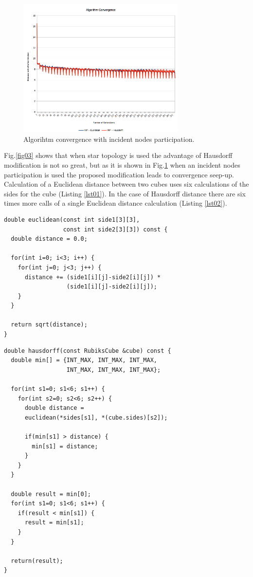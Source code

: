 \documentclass[runningheads]{llncs}
\begin{document}
\begin{figure}
\includegraphics[width=0.75\textwidth]{fig04.png}
\centering
\caption{Algorihtm convergence with incident nodes participation.} \label{fig04}
\end{figure}
\FloatBarrier

Fig.\ref{fig03} shows that when star topology is used the advantage of Hausdorff modification is not so great, but as it is shown in Fig.\ref{fig04} when an incident nodes participation is used the proposed modification leads to convergence seep-up. Calculation of a Euclidean distance between two cubes uses six calculations of the sides for the cube (Listing \ref{lst01}). In the case of Hausdorff distance there are six times more calls of a single Euclidean distance calculation (Listing \ref{lst02}).

\begin{lstlisting}[caption={Euclidean distance.},label={lst01},backgroundcolor=\color{very-light-gray},frame={single}]
double euclidean(const int side1[3][3], 
                 const int side2[3][3]) const {
  double distance = 0.0;

  for(int i=0; i<3; i++) {
    for(int j=0; j<3; j++) {
      distance += (side1[i][j]-side2[i][j]) * 
                  (side1[i][j]-side2[i][j]);
    }
  }

  return sqrt(distance);
}
\end{lstlisting}
\FloatBarrier

\begin{lstlisting}[caption={Hausdorff distance.},label={lst02},backgroundcolor=\color{very-light-gray},frame={single}]
double hausdorff(const RubiksCube &cube) const {
  double min[] = {INT_MAX, INT_MAX, INT_MAX, 
                  INT_MAX, INT_MAX, INT_MAX};

  for(int s1=0; s1<6; s1++) {
    for(int s2=0; s2<6; s2++) {
      double distance = 
      euclidean(*sides[s1], *(cube.sides)[s2]);

      if(min[s1] > distance) {
        min[s1] = distance;
      }
    }
  }

  double result = min[0];
  for(int s1=0; s1<6; s1++) {
    if(result < min[s1]) {
      result = min[s1];
    }
  }

  return(result);
}
\end{lstlisting}
\FloatBarrier
\end{document}
